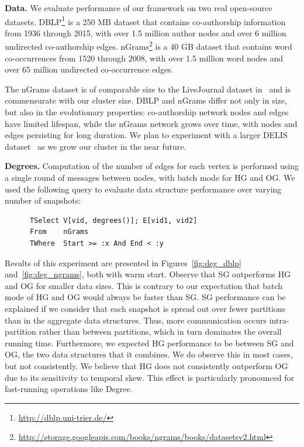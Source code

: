 {\bf Data.}  We evaluate performance of our framework on two real
open-source datasets.
DBLP\footnote{\url{http://dblp.uni-trier.de/}} is a 250 MB dataset
that contains co-authorship information from 1936 through 2015, with
over 1.5 million author nodes and over 6 million undirected
co-authorship edges.
%
nGrams\footnote{\url{http://storage.googleapis.com/books/ngrams/books/datasetsv2.html}}
is a 40 GB dataset that contains word co-occurrences from 1520 through
2008, with over 1.5 million word nodes and over 65 million undirected
co-occurrence edges.

The nGrams dataset is of comparable size to the LiveJournal dataset
in~\cite{Xin2013} and is commensurate with our cluster size.  DBLP and
nGrams differ not only in size, but also in the evolutionary
properties: co-authorship network nodes and edges have limited
lifespan, while the nGrams network grows over time, with nodes and
edges persisting for long duration.  
We plan to experiment with a larger DELIS
dataset~\cite{BoVWFI} as we grow our cluster in the near future.


{\bf Degrees.} Computation of the number of edges for each vertex is
performed using a single round of messages between nodes, with batch
mode for HG and OG.  We used the following query to evaluate data
structure performance over varying number of snapshots:

\begin{small}
\begin{verbatim}
      TSelect V[vid, degrees()]; E[vid1, vid2]
      From    nGrams
      TWhere  Start >= :x And End < :y
\end{verbatim}
\end{small}

Results of this experiment are presented in Figures~\ref{fig:deg_dblp}
and~\ref{fig:deg_ngrams}, both with warm start.  Observe that SG
outperforms HG and OG for smaller data sizes.  This is contrary to our
expectation that batch mode of HG and OG would always be faster than
SG.  SG performance can be explained if we consider that each snapshot
is spread out over fewer partitions than in the aggregate data
structures.  Thus, more communication occurs intra-partition rather
than between partitions, which in turn dominates the overall running
time.  Furthermore, we expected HG performance to be between SG and
OG, the two data structures that it combines.  We do observe this in
most cases, but not consistently.  We believe that HG does not
consistently outperform OG due to its sensitivity to temporal skew.
This effect is particularly pronounced for fast-running operations
like Degree.

